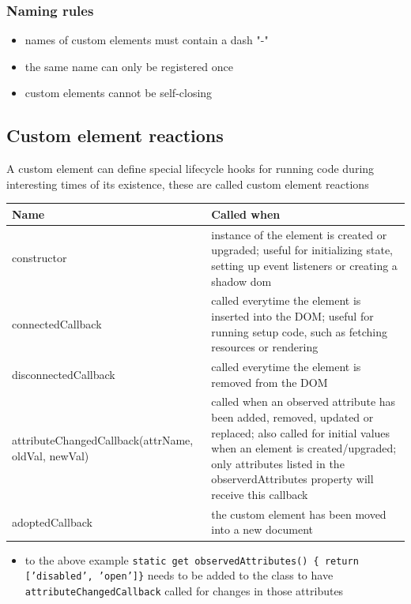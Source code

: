 \documentclass[11pt]{article}
\begin{document}
\subsubsection{Naming rules}
\label{sec:org25d4652}
\begin{itemize}
\item names of custom elements must contain a dash "-"
\item the same name can only be registered once
\item custom elements cannot be self-closing
\end{itemize}
\subsection{Custom element reactions}
\label{sec:org48d0ced}
A custom element can define special lifecycle hooks for running code during interesting times of its existence, these are called custom element reactions
\begin{center}
\begin{tabular}{p{6cm}p{10cm}}
Name & Called when\\
\hline
constructor & instance of the element is created or upgraded; useful for initializing state, setting up event listeners or creating a shadow dom\\
connectedCallback & called everytime the element is inserted into the DOM; useful for running setup code, such as fetching resources or rendering\\
disconnectedCallback & called everytime the element is removed from the DOM\\
attributeChangedCallback(attrName, oldVal, newVal) & called when an observed attribute has been added, removed, updated or replaced; also called for initial values when an element is created/upgraded; only attributes listed in the observerdAttributes property will receive this callback\\
adoptedCallback & the custom element has been moved into a new document\\
\end{tabular}
\end{center}
\begin{itemize}
\item to the above example \texttt{static get observedAttributes() \{ return ['disabled', 'open']\}} needs to be added to the class to have \texttt{attributeChangedCallback} called for changes in those attributes
\end{itemize}
\end{document}
